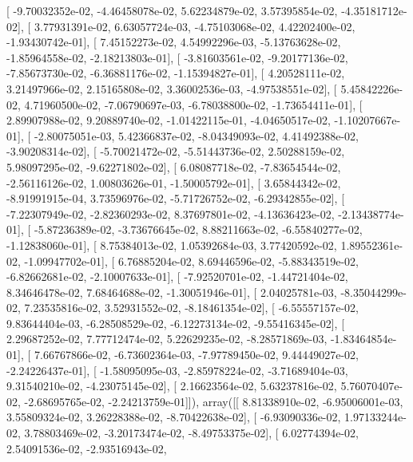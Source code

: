 \documentclass{article}
\begin{document}
       [ -9.70032352e-02,  -4.46458078e-02,   5.62234879e-02,
          3.57395854e-02,  -4.35181712e-02],
       [  3.77931391e-02,   6.63057724e-03,  -4.75103068e-02,
          4.42202400e-02,  -1.93430742e-01],
       [  7.45152273e-02,   4.54992296e-03,  -5.13763628e-02,
         -1.85964558e-02,  -2.18213803e-01],
       [ -3.81603561e-02,  -9.20177136e-02,  -7.85673730e-02,
         -6.36881176e-02,  -1.15394827e-01],
       [  4.20528111e-02,   3.21497966e-02,   2.15165808e-02,
          3.36002536e-03,  -4.97538551e-02],
       [  5.45842226e-02,   4.71960500e-02,  -7.06790697e-03,
         -6.78038800e-02,  -1.73654411e-01],
       [  2.89907988e-02,   9.20889740e-02,  -1.01422115e-01,
         -4.04650517e-02,  -1.10207667e-01],
       [ -2.80075051e-03,   5.42366837e-02,  -8.04349093e-02,
          4.41492388e-02,  -3.90208314e-02],
       [ -5.70021472e-02,  -5.51443736e-02,   2.50288159e-02,
          5.98097295e-02,  -9.62271802e-02],
       [  6.08087718e-02,  -7.83654544e-02,  -2.56116126e-02,
          1.00803626e-01,  -1.50005792e-01],
       [  3.65844342e-02,  -8.91991915e-04,   3.73596976e-02,
         -5.71726752e-02,  -6.29342855e-02],
       [ -7.22307949e-02,  -2.82360293e-02,   8.37697801e-02,
         -4.13636423e-02,  -2.13438774e-01],
       [ -5.87236389e-02,  -3.73676645e-02,   8.88211663e-02,
         -6.55840277e-02,  -1.12838060e-01],
       [  8.75384013e-02,   1.05392684e-03,   3.77420592e-02,
          1.89552361e-02,  -1.09947702e-01],
       [  6.76885204e-02,   8.69446596e-02,  -5.88343519e-02,
         -6.82662681e-02,  -2.10007633e-01],
       [ -7.92520701e-02,  -1.44721404e-02,   8.34646478e-02,
          7.68464688e-02,  -1.30051946e-01],
       [  2.04025781e-03,  -8.35044299e-02,   7.23535816e-02,
          3.52931552e-02,  -8.18461354e-02],
       [ -6.55557157e-02,   9.83644404e-03,  -6.28508529e-02,
         -6.12273134e-02,  -9.55416345e-02],
       [  2.29687252e-02,   7.77712474e-02,   5.22629235e-02,
         -8.28571869e-03,  -1.83464854e-01],
       [  7.66767866e-02,  -6.73602364e-03,  -7.97789450e-02,
          9.44449027e-02,  -2.24226437e-01],
       [ -1.58095095e-03,  -2.85978224e-02,  -3.71689404e-03,
          9.31540210e-02,  -4.23075145e-02],
       [  2.16623564e-02,   5.63237816e-02,   5.76070407e-02,
         -2.68695765e-02,  -2.24213759e-01]]), array([[  8.81338910e-02,  -6.95006001e-03,   3.55809324e-02,
          3.26228388e-02,  -8.70422638e-02],
       [ -6.93090336e-02,   1.97133244e-02,   3.78803469e-02,
         -3.20173474e-02,  -8.49753375e-02],
       [  6.02774394e-02,   2.54091536e-02,  -2.93516943e-02,
\end{document}
